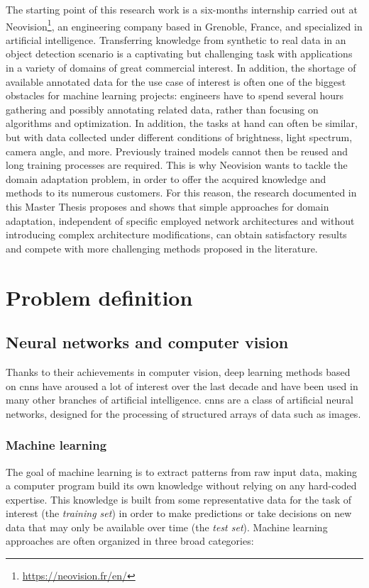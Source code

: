 \documentclass[%
    corpo=12pt,
    twoside,
    stile=classica,   
    tipotesi=magistrale,
    evenboxes,
    english,
	numerazioneromana,
]{toptesi}
\begin{document}
\bigskip
The starting point of this research work is a six-months internship carried out at Neovision\footnote{\url{https://neovision.fr/en/}}, an engineering company based in Grenoble, France, and specialized in artificial intelligence. Transferring knowledge from synthetic to real data in an object detection scenario is a captivating but challenging task with applications in a variety of domains of great commercial interest. In addition, the shortage of available annotated data for the use case of interest is often one of the biggest obstacles for machine learning projects: engineers have to spend several hours gathering and possibly annotating related data, rather than focusing on algorithms and optimization. In addition, the tasks at hand can often be similar, but with data collected under different conditions of brightness, light spectrum, camera angle, and more. Previously trained models cannot then be reused and long training processes are required. This is why Neovision wants to tackle the domain adaptation problem, in order to offer the acquired knowledge and methods to its numerous customers. For this reason, the research documented in this Master Thesis proposes and shows that simple approaches for domain adaptation, independent of specific employed network architectures and without introducing complex architecture modifications, can obtain satisfactory results and compete with more challenging methods proposed in the literature.


\chapter{Problem definition}
\section{Neural networks and computer vision}
Thanks to their achievements in computer vision, deep learning methods based on \glspl{cnn} have aroused a lot of interest over the last decade and have been used in many other branches of artificial intelligence. \Glspl{cnn} are a class of artificial neural networks, designed for the processing of structured arrays of data such as images.

\subsection{Machine learning}
The goal of machine learning is to extract patterns from raw input data, making a computer program build its own knowledge without relying on any hard-coded expertise. This knowledge is built from some representative data for the task of interest (the \textit{training set}) in order to make predictions or take decisions on new data that may only be available over time (the \textit{test set}). Machine learning approaches are often organized in three broad categories:
\end{document}
